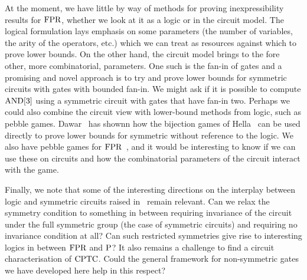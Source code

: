 \documentclass[../paper.tex]{subfiles}
\begin{document}
At the moment, we have little by way of methods for proving
inexpressibility results for $\text{\upshape FPR}$, whether we look at it as a logic
or in the circuit model.  The logical formulation lays emphasis
on some parameters (the number of variables, the arity of the
operators, etc.) which we can treat as resources against which to
prove lower bounds.  On the other hand, the circuit model brings to
the fore other, more combinatorial, parameters.  One such is the
fan-in of gates and a promising and novel approach is to try and prove lower bounds for symmetric circuits with gates with bounded fan-in.
We might ask if it is possible to compute $\text{\upshape AND}[3]$ using a symmetric circuit
with gates that have fan-in two.  Perhaps we could also combine the
circuit view with lower-bound methods from logic, such as pebble games.
 Dawar~\cite{Dawar2016} has shownn how the bijection games of
 Hella~\cite{Hella19961} can be used directly to prove lower
 bounds for symmetric without reference to the logic.  We also have pebble
 games for $\text{\upshape FPR}$~\cite{DawarH2012}, and it would be interesting to
 know if we can use these on circuits and how the combinatorial
 parameters of the circuit interact with the game.

Finally, we note that some of the interesting directions on the
interplay between logic and symmetric circuits raised
in~\cite{AndersonD17} remain relevant.  Can we relax the symmetry
condition to something in between requiring invariance of the circuit
under the full symmetric group (the case of symmetric circuits) and
requiring no invariance condition at all?  Can such restricted
symmetries give rise to interesting logics in between $\text{\upshape FPR}$ and
$\mathrm{P}$?  It also remains a challenge to find a circuit characterisation
of  $\text{\upshape CPTC}$.  Could the general framework for non-symmetric gates we
have developed here help in this respect?

\end{document}
